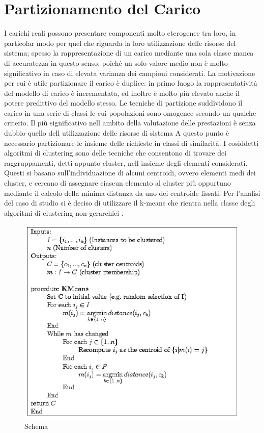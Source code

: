 \section{Partizionamento del Carico}
I carichi reali possono presentare componenti molto eterogenee tra loro, in particolar modo per quel 
che riguarda la loro utilizzazione delle risorse del sistema; spesso la rappresentazione di un carico 
mediante una sola classe manca di accuratezza in questo senso, poiché un solo valore medio non è 
molto significativo in caso di elevata varianza dei campioni considerati. 
La motivazione per cui è utile partizionare il carico è duplice: in primo luogo la rappresentatività 
del modello di carico è incrementata, ed inoltre è molto più elevato anche il potere predittivo del 
modello stesso. Le tecniche di partizione suddividono il carico in una serie di classi le cui 
popolazioni sono omogenee secondo un qualche criterio. Il più significativo nell ambito della 
valutazione delle prestazioni è senza dubbio quello dell utilizzazione delle risorse di sistema 
A questo punto è necessario partizionare le insieme delle richieste in classi di similarità. I cosiddetti 
algoritmi di clustering sono delle tecniche che consentono di trovare dei raggruppamenti, detti 
appunto cluster, nell insieme degli elementi considerati. Questi si basano sull'individuazione di 
alcuni centroidi, ovvero elementi medi dei cluster, e cercano di assegnare ciascun elemento al 
cluster più oppurtuno mediante il calcolo della minima distanza da uno dei centroide fissati. 
Per l'analisi del caso di studio si è deciso di utilizzare il k-means che rientra nella classe degli algoritmi di clustering non-gerarchici . 
\begin{figure}[H]
\begin{center}
\includegraphics[scale=0.71]{etc/kmeans.png}
\caption{Schema}
\label{schema3}
\end{center}
\end{figure}
